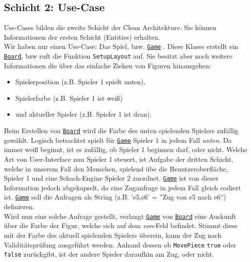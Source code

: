 \documentclass[
10pt, %
a4paper, %
oneside, %
headinclude,footinclude, %
BCOR5mm, %
]{scrartcl}
\begin{document}
\begin{onehalfspace}
\subsection{Schicht 2: Use-Case}
Use-Cases bilden die zweite Schicht der Clean Architekture. Sie können Informationen der ersten Schicht (Entities) erhalten.\\
Wir haben nur einen Use-Case: Das Spiel, bzw. \texttt{\href{https://github.com/schmida736/Chess-AdvancedSE/blob/main/Chess-AdvancedSE/Game\%20Elements/Game.cs}{Game}} . Diese Klasse erstellt ein \texttt{\href{https://github.com/schmida736/Chess-AdvancedSE/blob/main/Chess-AdvancedSE/Game\%20Elements/Board.cs}{Board}}, bzw ruft die Funktion \texttt{SetupLayout} auf. Sie besitzt aber noch weitere Informationen die über das einfache Ziehen von Figuren hinausgehen:
\begin{center}
	\begin{itemize}
		\item Spielerposition (z.B. Spieler 1 spielt unten),
		\item Spielerfarbe (z.B. Spieler 1 ist weiß)
		\item und aktueller Spieler (z.B. Spieler 1 ist dran).
	\end{itemize}
\end{center}
Beim Erstellen von \texttt{\href{https://github.com/schmida736/Chess-AdvancedSE/blob/main/Chess-AdvancedSE/Game\%20Elements/Board.cs}{Board}} wird die Farbe des unten spielenden Spielers zufällig gewählt. Logisch betrachtet spielt für \texttt{\href{https://github.com/schmida736/Chess-AdvancedSE/blob/main/Chess-AdvancedSE/Game\%20Elements/Game.cs}{Game}} Spieler 1 in jedem Fall \textit{unten}. Da immer weiß beginnt, ist es zufällig, ob Spieler 1 beginnen darf, oder nicht. Welche Art von User-Interface nun Spieler 1 steuert, ist Aufgabe der dritten Schicht, welche in unserem Fall den Menschen, spielend übe die Benutzeroberfläche, Spieler 1 und eine Schach-Engine Spieler 2 zuordnet. \texttt{\href{https://github.com/schmida736/Chess-AdvancedSE/blob/main/Chess-AdvancedSE/Game\%20Elements/Game.cs}{Game}} ist von dieser Information jedoch abgekapselt, da eine Zuganfrage in jedem Fall gleich codiert ist.
\texttt{\href{https://github.com/schmida736/Chess-AdvancedSE/blob/main/Chess-AdvancedSE/Game\%20Elements/Game.cs}{Game}} soll die Anfragen als String (z.B. 'e5,e6' = ''Zug von e5 nach e6'') definieren. \\
Wird nun eine solche Anfrage gestellt, verlangt \texttt{\href{https://github.com/schmida736/Chess-AdvancedSE/blob/main/Chess-AdvancedSE/Game\%20Elements/Game.cs}{Game}} von \texttt{\href{https://github.com/schmida736/Chess-AdvancedSE/blob/main/Chess-AdvancedSE/Game\%20Elements/Board.cs}{Board}} eine Auskunft über die Farbe der Figur, welche sich auf dem \textit{von}-Feld befindet. Stimmt diese mit der Farbe des aktuell spielenden Spielers überein, kann der Zug nach Validitätsprüfung ausgeführt werden. Anhand dessen ob \texttt{MovePiece} \texttt{true} oder \texttt{false} zurückgibt, ist der andere Spieler daraufhin am Zug, oder nicht.

\end{onehalfspace}
\end{document}

